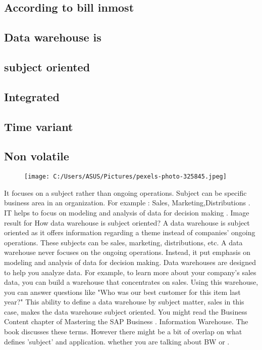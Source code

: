 \documentclass{article}
\begin{document}
\begin{flushleft}
 \tableofcontents
 \cleardoublepage
 
 \subsection{According to bill inmost} 
\subsection{Data warehouse is } 
\subsection{subject oriented} 
\subsection{Integrated} 
\subsection{Time variant}
\subsection{Non volatile} 
\end{flushleft}  

\newpage  


 \begin{figure}[hbtp]
 \centering
\texttt{[image: C:/Users/ASUS/Pictures/pexels-photo-325845.jpeg]} 
 \end{figure}
 
 It focuses on a subject rather than ongoing operations. Subject can be specific business area in an organization.   For example : Sales, Marketing,Distributions .
 IT helps to focus on modeling and analysis of data for decision making . Image result for How data warehouse is subject oriented?
A data warehouse is subject oriented as it offers information regarding a theme instead of companies' ongoing operations. These subjects can be sales, marketing, distributions, etc. A data warehouse never focuses on the ongoing operations. Instead, it put emphasis on modeling and analysis of data for decision making.
Data warehouses are designed to help you analyze data. For example, to learn more about your company's sales data, you can build a warehouse that concentrates on sales. Using this warehouse, you can answer questions like "Who was our best customer for this item last year?" This ability to define a data warehouse by subject matter, sales in this case, makes the data warehouse subject oriented.
You might read the Business Content chapter of Mastering the SAP Business .
Information Warehouse. The book discusses these terms. However there 
might be a bit of overlap on what defines 'subject' and application.
whether you are talking about BW or .
\end{document}
